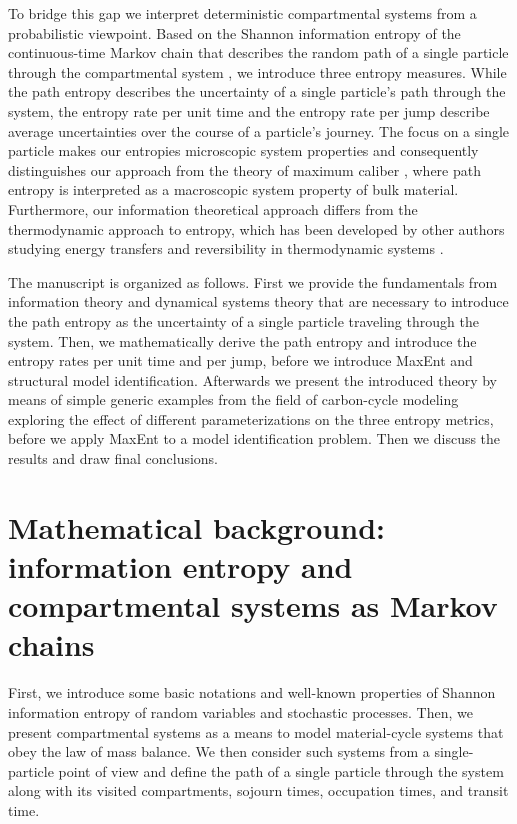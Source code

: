 \documentclass[smallextended]{svjour3}
\begin{document}
To bridge this gap we interpret deterministic compartmental systems from a probabilistic viewpoint.
Based on the Shannon information entropy \citep{Shannon1949TUoIP} of the continuous-time Markov chain that describes the random path of a single particle through the compartmental system \citep{Metzler2018MGS}, we introduce three entropy measures.
While the path entropy describes the uncertainty of a single particle's path through the system, the entropy rate per unit time and the entropy rate per jump describe average uncertainties over the course of a particle's journey. 
The focus on a single particle makes our entropies microscopic system properties and consequently distinguishes our approach from the theory of maximum caliber \citep[MaxCal,][]{jaynes1985macroscopic, Roach2020}, where path entropy is interpreted as a macroscopic system property of bulk material.
Furthermore, our information theoretical approach differs from the thermodynamic approach to entropy, which has been developed by other authors studying energy transfers and reversibility in thermodynamic systems \citep{Aoki1988, Haddad2010, Haddad2013, Haddad2019}.

The manuscript is organized as follows.
First we provide the fundamentals from information theory and dynamical systems theory that are necessary to introduce the path entropy as the uncertainty of a single particle traveling through the system.
Then, we mathematically derive the path entropy and introduce the entropy rates per unit time and per jump, before we introduce MaxEnt and structural model identification.
Afterwards we present the introduced theory by means of simple generic examples from the field of carbon-cycle modeling exploring the effect of different parameterizations on the three entropy metrics, before we apply MaxEnt to a model identification problem.
Then we discuss the results and draw final conclusions.


\section{Mathematical background: information entropy and compartmental systems as Markov chains}
First, we introduce some basic notations and well-known properties of Shannon information entropy of random variables and stochastic processes.
Then, we present compartmental systems as a means to model material-cycle systems that obey the law of mass balance.
We then consider such systems from a single-particle point of view and define the path of a single particle through the system along with its visited compartments, sojourn times, occupation times, and transit time.
\end{document}
